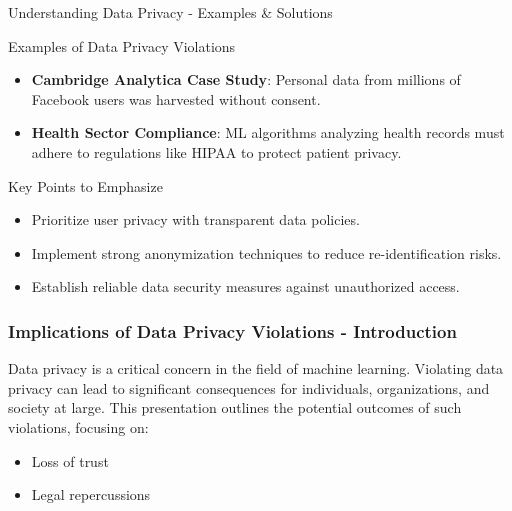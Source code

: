 \documentclass[aspectratio=169]{beamer}
\begin{document}
\begin{frame}[fragile]{Understanding Data Privacy - Examples & Solutions}
    \begin{block}{Examples of Data Privacy Violations}
        \begin{itemize}
            \item \textbf{Cambridge Analytica Case Study}: Personal data from millions of Facebook users was harvested without consent.
            \item \textbf{Health Sector Compliance}: ML algorithms analyzing health records must adhere to regulations like HIPAA to protect patient privacy.
        \end{itemize}
    \end{block}

    \begin{block}{Key Points to Emphasize}
        \begin{itemize}
            \item Prioritize user privacy with transparent data policies.
            \item Implement strong anonymization techniques to reduce re-identification risks.
            \item Establish reliable data security measures against unauthorized access.
        \end{itemize}
    \end{block}
\end{frame}

\begin{frame}[fragile]
    \frametitle{Implications of Data Privacy Violations - Introduction}
    Data privacy is a critical concern in the field of machine learning. Violating data privacy can lead to significant consequences for individuals, organizations, and society at large. This presentation outlines the potential outcomes of such violations, focusing on:
    \begin{itemize}
        \item Loss of trust
        \item Legal repercussions
    \end{itemize}
\end{frame}
\end{document}
